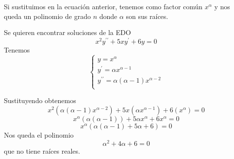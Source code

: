 Si sustituimos en la ecuación anterior, tenemos como factor común $x^\alpha$ y nos queda un polinomio de grado $n$ donde $\alpha$ son sus raíces.

\begin{example}
Se quieren encontrar soluciones de la EDO $$x^2y^{\prime\prime}+5xy^\prime+6y=0$$
Tenemos
\begin{equation*}
  \left\lbrace
  \begin{array}{l}
  	 y=x^\alpha \\
     y^\prime = \alpha x^{\alpha-1}\\
     y^{\prime\prime} = \alpha(\alpha-1)x^{\alpha-2}\\
  \end{array}
  \right.
\end{equation*}

Sustituyendo obtenemos
$$x^2(\alpha(\alpha-1)x^{\alpha-2})+5x(\alpha x^{\alpha-1})+6(x^\alpha) = 0$$
$$x^\alpha(\alpha(\alpha-1))+5\alpha x^\alpha+6x^\alpha = 0$$
$$x^\alpha(\alpha(\alpha-1)+5\alpha+6) = 0$$
Nos queda el polinomio
$$\alpha^2+4\alpha+6 = 0$$ que no tiene raíces reales.
\end{example}


